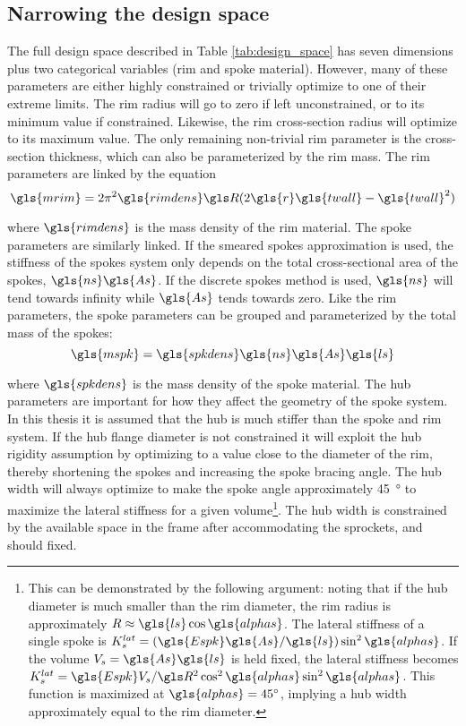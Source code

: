 \documentclass[\rootdir/thesis.tex]{subfiles}
\begin{document}
\subsection{Narrowing the design space}

The full design space described in Table \ref{tab:design_space} has seven dimensions plus two categorical variables (rim and spoke material). However, many of these parameters are either highly constrained or trivially optimize to one of their extreme limits. The rim radius will go to zero if left unconstrained, or to its minimum value if constrained. Likewise, the rim cross-section radius will optimize to its maximum value. The only remaining non-trivial rim parameter is the cross-section thickness, which can also be parameterized by the rim mass. The rim parameters are linked by the equation
\begin{equation}
\label{eq:m_rim}
\gls{mrim} = 2\pi^2 \gls{rimdens} \R (2\gls{r}\gls{twall} - \gls{twall}^2)
\end{equation}

where $\gls{rimdens}$ is the mass density of the rim material. The spoke parameters are similarly linked. If the smeared spokes approximation is used, the stiffness of the spokes system only depends on the total cross-sectional area of the spokes, $\gls{ns}\gls{As}$. If the discrete spokes method is used, $\gls{ns}$ will tend towards infinity while $\gls{As}$ tends towards zero. Like the rim parameters, the spoke parameters can be grouped and parameterized by the total mass of the spokes:
\begin{equation}
\label{eq:m_spokes}
\gls{mspk} = \gls{spkdens} \gls{ns} \gls{As} \gls{ls}
\end{equation}

where $\gls{spkdens}$ is the mass density of the spoke material. The hub parameters are important for how they affect the geometry of the spoke system. In this thesis it is assumed that the hub is much stiffer than the spoke and rim system. If the hub flange diameter is not constrained it will exploit the hub rigidity assumption by optimizing to a value close to the diameter of the rim, thereby shortening the spokes and increasing the spoke bracing angle. The hub width will always optimize to make the spoke angle approximately \SI{45}{\degree} to maximize the lateral stiffness for a given volume\footnote{This can be demonstrated by the following argument: noting that if the hub diameter is much smaller than the rim diameter, the rim radius is approximately $R \approx \gls{ls} \cos{\gls{alphas}}$. The lateral stiffness of a single spoke is $K_s^{lat} = (\gls{Espk}\gls{As}/\gls{ls})\sin^2{\gls{alphas}}$. If the volume $V_s=\gls{As}\gls{ls}$ is held fixed, the lateral stiffness becomes $K_s^{lat} = \gls{Espk}V_s/\R^2 \cos^2{\gls{alphas}}\sin^2{\gls{alphas}}$. This function is maximized at $\gls{alphas}=\SI{45}{\degree}$, implying a hub width approximately equal to the rim diameter.}. The hub width is constrained by the available space in the frame after accommodating the sprockets, and should fixed.
\end{document}
